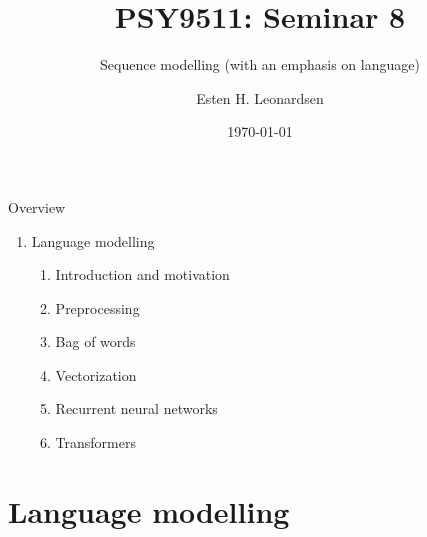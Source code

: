 \documentclass[10pt]{beamer}
\title{PSY9511: Seminar 8}
\subtitle{Sequence modelling (with an emphasis on language)}
\author{Esten H. Leonardsen}
\date{\today}
\begin{document}
	\begin{frame}
	 	\titlepage
	\end{frame}

    \begin{frame}{Overview}
        \begin{enumerate}
            \item Language modelling
            \begin{enumerate}
                \item Introduction and motivation
                \item Preprocessing
                \item Bag of words
                \item Vectorization
                \item Recurrent neural networks
                \item Transformers
            \end{enumerate}
        \end{enumerate}
    \end{frame}

    \section{Language modelling}
\end{document}
